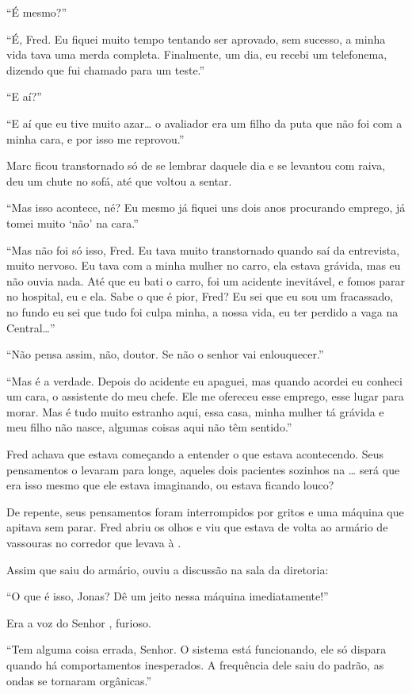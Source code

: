 ``É mesmo?''

``É, Fred. Eu fiquei muito tempo tentando ser aprovado, sem sucesso, a
minha vida tava uma merda completa. Finalmente, um dia, eu recebi um
telefonema, dizendo que fui chamado para um teste.''

``E aí?''

``E aí que eu tive muito azar\ldots{} o avaliador era um filho da puta que
não foi com a minha cara, e por isso me reprovou.''

Marc ficou transtornado só de se lembrar daquele dia e se levantou com
raiva, deu um chute no sofá, até que voltou a sentar.

``Mas isso acontece, né? Eu mesmo já fiquei uns dois anos procurando
emprego, já tomei muito `não' na cara.''

``Mas não foi só isso, Fred. Eu tava muito transtornado quando saí da
entrevista, muito nervoso. Eu tava com a minha mulher no carro, ela
estava grávida, mas eu não ouvia nada. Até que eu bati o carro, foi um
acidente inevitável, e fomos parar no hospital, eu e ela. Sabe o que é
pior, Fred? Eu sei que eu sou um fracassado, no fundo eu sei que tudo
foi culpa minha, a nossa vida, eu ter perdido a vaga na Central\ldots{}''

``Não pensa assim, não, doutor. Se não o senhor vai
enlouquecer.''

``Mas é a verdade. Depois do acidente eu apaguei, mas quando acordei eu
conheci um cara, o assistente do meu chefe. Ele me ofereceu esse
emprego, esse lugar para morar. Mas é tudo muito estranho aqui, essa
casa, minha mulher tá grávida e meu filho não nasce, algumas coisas aqui
não têm sentido.''

Fred achava que estava começando a entender o que estava acontecendo.
Seus pensamentos o levaram para longe, aqueles dois pacientes sozinhos
na \ldots{} será que era isso mesmo que ele estava imaginando,
ou estava ficando louco?

De repente, seus pensamentos foram interrompidos por gritos e uma
máquina que apitava sem parar. Fred abriu os olhos e viu que estava de
volta ao armário de vassouras no corredor que levava à .

Assim que saiu do armário, ouviu a discussão na sala da diretoria:

``O que é isso, Jonas? Dê um jeito nessa máquina imediatamente!''

Era a voz do Senhor , furioso.

``Tem alguma coisa errada, Senhor. O sistema está funcionando, ele só
dispara quando há comportamentos inesperados. A frequência dele saiu do
padrão, as ondas se tornaram orgânicas.''

